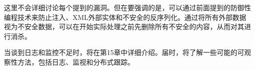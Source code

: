 这里不会详细讨论每个提到的漏洞。但在要强调的是，可以通过前面提到的防御性编程技术来防止注入、XML外部实体和不安全的反序列化。通过将所有外部数据视为不安全数据，可以在开始实际处理之前先删除所有不安全的内容，从而对其进行消杀。

当谈到日志和监控不足时，将在第15章中详细介绍。届时，将了解一些可能的可观察性方法，包括日志、监视和分布式跟踪。


















